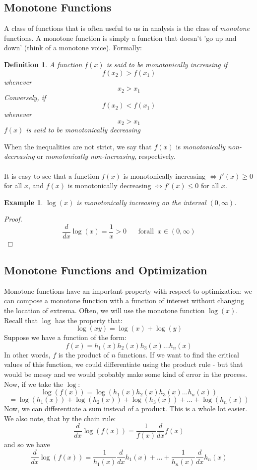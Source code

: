 \documentclass[12pt,a4paper]{article} %
\newtheorem{defn}{Definition}
\newtheorem{example}{Example}
\begin{document}
\newpage
\subsection{Monotone Functions}
A class of functions that is often useful to us in analysis is the class of \emph{monotone} functions.  A monotone function is simply a function that doesn't 'go up and down' (think of a monotone voice).  Formally:
\begin{defn}
A function $f(x)$ is said to be \emph{monotonically increasing} if
$$f(x_2) > f(x_1)$$
whenever
$$x_2 > x_1$$ 
Conversely, if 
$$f(x_2) < f(x_1)$$
whenever
$$x_2 > x_1$$
$f(x)$ is said to be \emph{monotonically decreasing} 
\end{defn}
When the inequalities are not strict, we say that $f(x)$ is \emph{monotonically non-decreasing} or \emph{monotonically non-increasing}, respectively. \\\\
 It is easy to see that a function $f(x)$ is monotonically increasing $\iff f'(x)\geq0$ for all $x$, and $f(x)$ is monotonically decreasing $\iff f'(x)\leq0$ for all $x$.   
\begin{example}
$\log(x)$ is monotonically increasing on the interval $(0,\infty)$. 
\end{example}
\begin{proof}
$$\frac{d}{dx}\log(x) = \frac{1}{x} > 0 \;\;\;\;\;\;\mathrm{for all }\;\; x\in(0,\infty)$$
\end{proof}
\subsection{Monotone Functions and Optimization}
Monotone functions have an important property with respect to optimization: we can compose a monotone function with a function of interest without changing the location of extrema.  Often, we will use the monotone function $\log(x)$. Recall that $\log$ has the property that:
$$\log(xy) = \log(x) + \log(y)$$
Suppose we have a function of the form:
$$f(x) = h_1(x)h_2(x)h_3(x)...h_n(x)$$
In other words, $f$ is the product of $n$ functions.  If we want to find the critical values of this function, we could differentiate using the product rule - but that would be messy and we would probably make some kind of error in the process.  Now, if we take the $\log$:
$$\log(f(x)) = \log(h_1(x)h_2(x)h_3(x)...h_n(x))$$
$$= \log(h_1(x))+ \log(h_2(x))+\log(h_3(x))+...+\log(h_n(x))$$
Now, we can differentiate a sum instead of a product.  This is a whole lot easier.  We also note, that by the chain rule:
$$\frac{d}{dx}\log(f(x)) = \frac{1}{f(x)}\frac{d}{dx}f(x)$$
and so we have
$$\frac{d}{dx}\log(f(x)) = \frac{1}{h_1(x)}\frac{d}{dx}h_1(x)+...+\frac{1}{h_n(x)}\frac{d}{dx}h_n(x)$$
\end{document}
